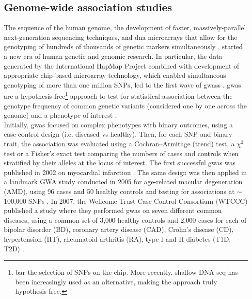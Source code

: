 \newpage

\subsection{Genome-wide association studies}
\label{sec:gwas}

The sequence of the human genome, the development of faster, massively-parallel next-generation sequencing techniques, 
and \gls{dna} microarrays that allow for the genotyping of hundreds of thousands of genetic markers simultaneously \cite{wang1998large}, started a new era of human genetic and genomic research.
In particular, the data generated by the International HapMap Project combined with development of appropriate chip-based microarray technology, which enabled simultaneous genotyping of more than one million SNPs, led to the first wave of \glspl{gwas} \cite{visscher2012five}.
\gls{gwas} are a hypothesis-free\footnote{bar the selection of SNPs on the chip. 
More recently, shallow DNA-seq has been increasingly used as an alternative, making the approach truly hypothesis-free.} approach to test for statistical association between the genotype frequency of common genetic variants (considered one by one across the genome) and a phenotype of interest \cite{mccarthy2008genome}. \\

Initially, \gls{gwas} focused on complex phenotypes with binary outcomes, using a case-control design (i.e. diseased vs healthy).
Then, for each SNP and binary trait, the association was evaluated using a Cochran–Armitage (trend) test, a $\chi^2$ test or a Fisher's exact test comparing the numbers of cases and controls when stratified by their alleles at the locus of interest. 
The first successful \gls{gwas} was published in 2002 on myocardial infarction \cite{ozaki2002functional}.
The same design was then applied in a landmark GWA study conducted in 2005 for age-related macular degeneration (AMD), using 96 cases and 50 healthy controls and testing for associations at $\sim$100,000 SNPs \cite{klein2005complement}. 
In 2007, the Wellcome Trust Case-Control Consortium (WTCCC) published a study where they performed \gls{gwas} on seven different common diseases, using a common set of 3,000 healthy controls and 2,000 cases for each of bipolar disorder (BD), coronary artery disease (CAD), Crohn's disease (CD), hypertension (HT), rheumatoid arthritis (RA), type I and II diabetes (T1D, T2D) \cite{wellcome2007genome}.\\

